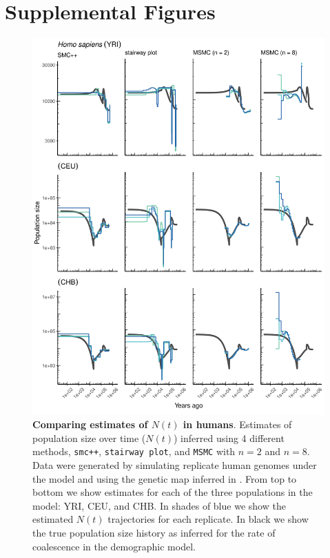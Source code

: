 \documentclass[12pt,halfline,a4paper]{ouparticle}
\newcommand{\beginsupplement}{%
        \setcounter{table}{0}
        \renewcommand{\thetable}{S\arabic{table}}%
        \setcounter{figure}{0}
        \renewcommand{\thefigure}{S\arabic{figure}}%
     }
\newcommand{\MSMC}{\texttt{MSMC}\xspace}
\newcommand{\smcpp}{\texttt{smc++}\xspace}
\newcommand{\stairwayplot}{\texttt{stairway plot}\xspace}
\begin{document}



\pagebreak
\beginsupplement
\section*{Supplemental Figures}
\begin{figure}
\begin{center}
\includegraphics[width=0.8\linewidth]{display_items/homo_sapiens_mask_Gutenkunst.png}
\caption{\textbf{Comparing estimates of $N(t)$ in humans}. Estimates of population
size over time ($N(t)$) inferred using 4 different methods, \smcpp, \stairwayplot, and
\MSMC with $n=2$ and $n=8$. Data were generated by simulating
replicate human genomes under the \cite{gutenkunst2009inferring} model and using the genetic map
inferred in \cite{international2007second}. From top to bottom we show estimates for each
of the three populations in the model: YRI, CEU, and CHB. In shades of blue we show the estimated
$N(t)$ trajectories for each replicate. In black we show the true population size history as inferred
for the rate of coalescence in the demographic model.}
\label{fig:n_t_gutenkunst}
\end{center}
\end{figure}
\end{document}
